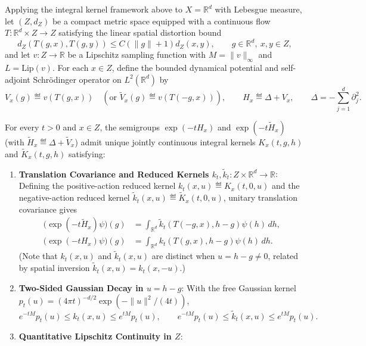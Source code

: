 Applying the integral kernel framework above to $X = \mathbb{R}^d$ with Lebesgue measure, let $(Z, d_Z)$ be a compact metric space equipped with a continuous flow $T : \mathbb{R}^d \times Z \to Z$ satisfying the linear spatial distortion bound
\[
  d_Z(T(g, x), T(g, y)) \le C(\|g\| + 1) d_Z(x, y), \qquad g \in \mathbb{R}^d,\ x, y \in Z,
\]
and let $v : Z \to \mathbb{R}$ be a Lipschitz sampling function with $M = \|v\|_\infty$ and $L = \mathrm{Lip}(v)$. For each $x \in Z$, define the bounded dynamical potential and self-adjoint Schr\"odinger operator on $L^2(\mathbb{R}^d)$ by
\[
  V_x(g) \eqdef v(T(g, x)) \quad (\text{or } \widetilde{V}_x(g) \eqdef v(T(-g, x))),
  \qquad
  H_x \eqdef \Delta + V_x,
  \qquad
  \Delta = -\sum_{j=1}^d \partial_j^2.
\]

\begin{theorem}
\label{thm:section_6_dynamical_bridge}
For every $t > 0$ and $x \in Z$, the semigroups $\exp(-t H_x)$ and $\exp(-t \widetilde{H}_x)$ (with $\widetilde{H}_x \eqdef \Delta + \widetilde{V}_x$) admit unique jointly continuous integral kernels $K_x(t, g, h)$ and $\widetilde{K}_x(t, g, h)$ satisfying:
\begin{enumerate}
  \item \textbf{Translation Covariance and Reduced Kernels $k_t, \widetilde{k}_t : Z \times \mathbb{R}^d \to \mathbb{R}$}:
  Defining the positive-action reduced kernel $k_t(x, u) \eqdef K_x(t, 0, u)$ and the negative-action reduced kernel $\widetilde{k}_t(x, u) \eqdef \widetilde{K}_x(t, 0, u)$, unitary translation covariance gives
  \[
  \begin{aligned}
    \bigl(\exp(-t \widetilde{H}_x)\psi\bigr)(g) &= \int_{\mathbb{R}^d} \widetilde{k}_t(T(-g, x), h - g)\psi(h)\,dh, \\
    \bigl(\exp(-t H_x)\psi\bigr)(g) &= \int_{\mathbb{R}^d} k_t(T(g, x), h - g)\psi(h)\,dh.
  \end{aligned}
  \]
  (Note that $k_t(x, u)$ and $\widetilde{k}_t(x, u)$ are distinct when $u = h - g \neq 0$, related by spatial inversion $\widetilde{k}_t(x, u) = k_t(x, -u)$.)
  \item \textbf{Two-Sided Gaussian Decay in $u = h - g$}:
  With the free Gaussian kernel $p_t(u) = (4\pi t)^{-d/2}\exp(-\|u\|^2/(4t))$,
  \[
    e^{-t M} p_t(u) \le k_t(x, u) \le e^{t M} p_t(u),
    \qquad
    e^{-t M} p_t(u) \le \widetilde{k}_t(x, u) \le e^{t M} p_t(u).
  \]
  \item \textbf{Quantitative Lipschitz Continuity in $Z$}:

\end{enumerate}
\end{theorem}
